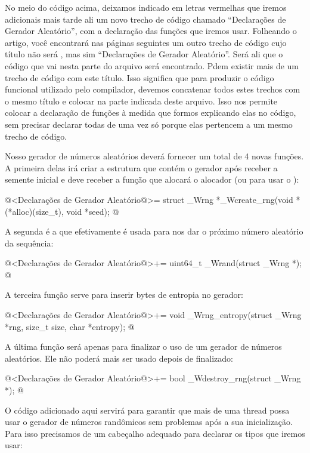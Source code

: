 No meio do código acima, deixamos indicado em letras vermelhas que
iremos adicionais mais tarde ali um novo trecho de código chamado
``Declarações de Gerador Aleatório'', com a declaração das funções que
iremos usar. Folheando o artigo, você encontrará nas páginas seguintes
um outro trecho de código cujo título não será ,
mas sim ``Declarações de Gerador Aleatório''. Será ali que o código que
vai nesta parte do arquivo será encontrado. Pdem existir mais de um
trecho de código com este título. Isso significa que para produzir o
código funcional utilizado pelo compilador, devemos concatenar todos
estes trechos com o mesmo título e colocar na parte indicada deste
arquivo. Isso nos permite colocar a declaração de funções à medida que
formos explicando elas no código, sem precisar declarar todas de uma
vez só porque elas pertencem a um mesmo trecho de código.


Nosso gerador de números aleatórios deverá fornecer um total de 4
novas funções. A primeira delas irá criar a estrutura que contém o
gerador após receber a semente inicial e deve receber a função que
alocará o alocador (ou  para usar
o ):

\iniciocodigo
@<Declarações de Gerador Aleatório@>=
struct _Wrng *_Wcreate_rng(void *(*alloc)(size_t), void *seed);
@
\fimcodigo

A segunda é a que efetivamente é usada para nos dar o próximo número
aleatório da sequência:

\iniciocodigo
@<Declarações de Gerador Aleatório@>+=
uint64_t _Wrand(struct _Wrng *);
@
\fimcodigo

A terceira função serve para inserir bytes de entropia no gerador:

\iniciocodigo
@<Declarações de Gerador Aleatório@>+=
void _Wrng_entropy(struct _Wrng *rng, size_t size, char *entropy);
@
\fimcodigo

A última função será apenas para finalizar o uso de um gerador de
números aleatórios. Ele não poderá mais ser usado depois de
finalizado:

\iniciocodigo
@<Declarações de Gerador Aleatório@>+=
bool _Wdestroy_rng(struct _Wrng *);
@
\fimcodigo


O código adicionado aqui servirá para garantir que mais de uma thread
possa usar o gerador de números randômicos sem problemas após a sua
inicialização. Para isso precisamos de um cabeçalho adequado para
declarar os tipos que iremos usar:

